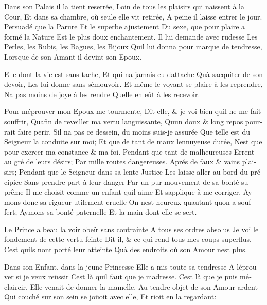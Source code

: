 \documentclass[14pt,a4paper]{memoir}
\begin{document}
\begin{otherlanguage}{french}
{Dans son Palais il la tient reserrée,} {Loin de tous les plaisirs qui
naissent à la Cour, } {Et dans sa chambre, où seule elle vit retirée,}
{A peine il laisse entrer le jour.} {Persuadé que la Parure} {Et le
superbe ajustement} {Du sexe, que pour plaire a formé la Nature} {Est le
plus doux enchantement.} {Il lui demande avec rudesse} {Les Perles, les
Rubis, les Bagues, les Bijoux} {Qu\textquotesingle il lui donna pour
marque de tendresse,} {Lorsque de son Amant il devint son Epoux.}

{Elle dont la vie est sans tache,} {Et qui n\textquotesingle a jamais eu
d\textquotesingle attache} {Qu\textquotesingle à
s\textquotesingle acquiter de son devoir,} {Les lui donne sans
s\textquotesingle émouvoir.} {Et même le voyant se plaire à les
reprendre,} {N\textquotesingle a pas moins de joye à les rendre}
{Qu\textquotesingle elle en eût à les recevoir.}

{Pour m\textquotesingle éprouver mon Epoux me tourmente,} {Dit-elle, \&
je voi bien qu\textquotesingle il ne me fait souffrir,}
{Qu\textquotesingle afin de reveiller ma vertu languissante,}
{Qu\textquotesingle un doux \& long repos pourrait faire perir. }
{S\textquotesingle il n\textquotesingle a pas ce dessein, du moins
suis-je assurée } {Que telle est du Seigneur la conduite sur moi;} {Et
que de tant de maux l\textquotesingle ennuyeuse durée,}
{N\textquotesingle est que pour exercer ma constance \& ma foi. }
{Pendant que tant de malheureuses} {Errent au gré de leurs désirs;} {Par
mille routes dangereuses.} {Aprés de faux \& vains plaisirs;} {Pendant
que le Seigneur dans sa lente Justice} {Les laisse aller au bord du
précipice} {Sans prendre part à leur danger} {Par un pur mouvement de sa
bonté suprême} {Il me choisit comme un enfant qu\textquotesingle il
aime} {Et s\textquotesingle applique à me corriger.} {Aymons donc sa
rigueur utilement cruelle} {On n\textquotesingle est heureux
qu\textquotesingle autant qu\textquotesingle on a souffert;} {Aymons sa
bonté paternelle} {Et la main dont elle se sert.}

{Le Prince a beau la voir obeïr sans contrainte} {A tous ses ordres
absolus} {Je voi le fondement de cette vertu feinte} {Dit-il, \& ce qui
rend tous mes coups superflus,} {C\textquotesingle est
qu\textquotesingle ils n\textquotesingle ont porté leur atteinte}
{Qu\textquotesingle à des endroits où son Amour n\textquotesingle est
plus.}

{Dans son Enfant, dans la jeune Princesse} {Elle a mis toute sa
tendresse} {A l\textquotesingle éprouver si je veux reüssir}
{C\textquotesingle est là qu\textquotesingle il faut que je
m\textquotesingle adresse.} {C\textquotesingle est là que je puis
m\textquotesingle éclaircir.} {Elle venait de donner la mamelle,} {Au
tendre objet de son Amour ardent} {Qui couché sur son sein se joüoit
avec elle,} {Et rioit en la regardant:}


\end{otherlanguage}
\end{document}
